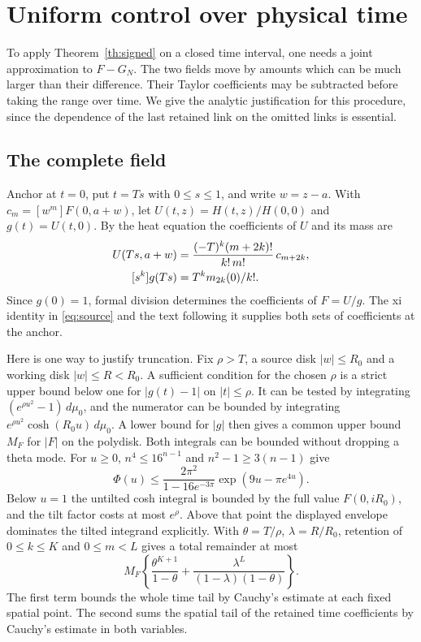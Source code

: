 \section{Uniform control over physical time}\label{sec:time}
To apply Theorem~\ref{th:signed} on a closed time interval, one needs a joint approximation to \(F-G_N\). The two fields move by amounts which can be much larger than their difference. Their Taylor coefficients may be subtracted before taking the range over time. We give the analytic justification for this procedure, since the dependence of the last retained link on the omitted links is essential.

\subsection{The complete field}
Anchor at \(t=0\), put \(t=Ts\) with \(0\le s\le1\), and write \(w=z-a\). With \(c_m=[w^m]F(0,a+w)\), let \(U(t,z)=H(t,z)/H(0,0)\) and \(g(t)=U(t,0)\). By the heat equation the coefficients of \(U\) and its mass are
\begin{align}
 [s^kw^m]U(Ts,a+w)&=\frac{(-T)^k(m+2k)!}{k!\,m!}\,c_{m+2k}, \notag\\
 [s^k]g(Ts)&=T^km_{2k}(0)/k! . \label{eq:taylor-source}
\end{align}
Since \(g(0)=1\), formal division determines the coefficients of \(F=U/g\). The xi identity in \eqref{eq:source} and the text following it supplies both sets of coefficients at the anchor.

Here is one way to justify truncation. Fix \(\rho>T\), a source disk \(|w|\le R_0\) and a working disk \(|w|\le R<R_0\). A sufficient condition for the chosen \(\rho\) is a strict upper bound below one for \(|g(t)-1|\) on \(|t|\le\rho\). It can be tested by integrating \((e^{\rho u^2}-1)\,d\mu_0\), and the numerator can be bounded by integrating \(e^{\rho u^2}\cosh(R_0u)\,d\mu_0\). A lower bound for \(|g|\) then gives a common upper bound \(M_F\) for \(|F|\) on the polydisk. Both integrals can be bounded without dropping a theta mode. For \(u\ge0\), \(n^4\le16^{n-1}\) and \(n^2-1\ge3(n-1)\) give
\[
 \Phi(u)\le \frac{2\pi^2}{1-16e^{-3\pi}}\exp(9u-\pi e^{4u}).
\]
Below \(u=1\) the untilted cosh integral is bounded by the full value \(F(0,iR_0)\), and the tilt factor costs at most \(e^\rho\). Above that point the displayed envelope dominates the tilted integrand explicitly. With \(\theta=T/\rho\), \(\lambda=R/R_0\), retention of \(0\le k\le K\) and \(0\le m<L\) gives a total remainder at most
\begin{equation}
 M_F\left\{\frac{\theta^{K+1}}{1-\theta}
        +\frac{\lambda^L}{(1-\lambda)(1-\theta)}\right\}.
 \label{eq:source-tail}
\end{equation}
The first term bounds the whole time tail by Cauchy's estimate at each fixed spatial point. The second sums the spatial tail of the retained time coefficients by Cauchy's estimate in both variables.

